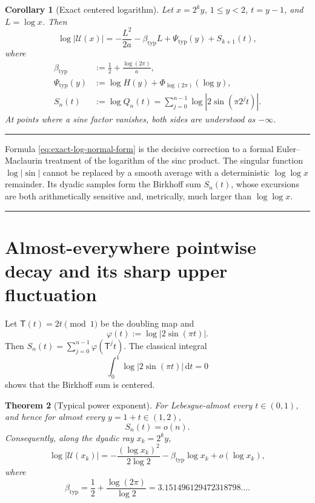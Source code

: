 \documentclass[11pt,oneside]{article}
\newtheorem{theorem}{Theorem}[section]
\newtheorem{corollary}[theorem]{Corollary}
\theoremstyle{definition}
\theoremstyle{remark}
\newcommand{\dd}{\,\mathrm d}
\newcommand{\Uhat}{\mathcal U}
\newcommand{\T}{\mathsf T}
\newenvironment{boxedremark}{%
  \par\smallskip\noindent\begin{center}\begin{minipage}{0.94\textwidth}%
  \color{black}\hrule\vspace{0.6em}\small
}{%
  \vspace{0.6em}\hrule\end{minipage}\end{center}\smallskip
}
\begin{document}
\begin{corollary}[Exact centered logarithm]\label{cor:centered-log}
Let $x=2^ky$, $1\le y<2$, $t=y-1$, and $L=\log x$.  Then
\begin{equation}\label{eq:exact-log-normal-form}
 \log|\Uhat(x)|
 =-\frac{L^2}{2a}-\beta_{\mathrm{typ}}L
  +\Psi_{\mathrm{typ}}(y)+S_{k+1}(t),
\end{equation}
where
\begin{align}
 \beta_{\mathrm{typ}}
   &:=\frac12+\frac{\log(2\pi)}{a},\label{eq:beta-typ-def}\\
 \Psi_{\mathrm{typ}}(y)
   &:=\log H(y)+\Phi_{\log(2\pi)}(\log y),\label{eq:Psi-typ}\\
 S_n(t)&:=\log Q_n(t)
 =\sum_{j=0}^{n-1}\log|2\sin(\pi2^jt)|.
 \label{eq:Sn}
\end{align}
At points where a sine factor vanishes, both sides are understood as $-\infty$.
\end{corollary}

\begin{boxedremark}
Formula \eqref{eq:exact-log-normal-form} is the decisive correction to a formal
Euler--Maclaurin treatment of the logarithm of the sinc product.  The singular function
$\log|\sin|$ cannot be replaced by a smooth average with a deterministic
$\log\log x$ remainder.  Its dyadic samples form the Birkhoff sum $S_n(t)$, whose
excursions are both arithmetically sensitive and, metrically, much larger than
$\log\log x$.
\end{boxedremark}

\section{Almost-everywhere pointwise decay and its sharp upper fluctuation}
\label{sec:typical}

Let $\T(t)=2t\pmod1$ be the doubling map and
\begin{equation}\label{eq:phi}
 \varphi(t):=\log|2\sin(\pi t)|.
\end{equation}
Then $S_n(t)=\sum_{j=0}^{n-1}\varphi(\T^jt)$.  The classical integral
\begin{equation}\label{eq:logsin-mean}
 \int_0^1\log|2\sin(\pi t)|\dd t=0
\end{equation}
shows that the Birkhoff sum is centered.

\begin{theorem}[Typical power exponent]\label{thm:typical}
For Lebesgue-almost every $t\in(0,1)$, and hence for almost every $y=1+t\in(1,2)$,
\begin{equation}\label{eq:Sn-sublinear}
 S_n(t)=o(n).
\end{equation}
Consequently, along the dyadic ray $x_k=2^ky$,
\begin{equation}\label{eq:typical-log-asymptotic}
 \log|\Uhat(x_k)|
 =-\frac{(\log x_k)^2}{2\log2}
  -\beta_{\mathrm{typ}}\log x_k+o(\log x_k),
\end{equation}
where
\begin{equation}\label{eq:beta-typ-value}
 \beta_{\mathrm{typ}}
 =\frac12+\frac{\log(2\pi)}{\log2}
 =3.151496129472318798\ldots .
\end{equation}
\end{theorem}
\end{document}
